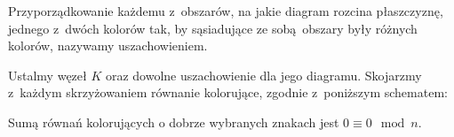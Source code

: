 \begin{definition}[uszachowienie]
    Przyporządkowanie każdemu z~obszarów, na jakie diagram rozcina płaszczyznę, jednego z~dwóch kolorów tak, by sąsiadujące ze sobą obszary były różnych kolorów, nazywamy uszachowieniem.
\end{definition}

Ustalmy węzeł $K$ oraz dowolne uszachowienie dla jego diagramu.
Skojarzmy z~każdym skrzyżowaniem równanie kolorujące, zgodnie z~poniższym schematem:
\begin{comment}
\[\begin{tikzpicture}[baseline=-0.65ex, scale=0.12]
    \useasboundingbox (-5, -10) rectangle (5,5);
    \begin{knot}[clip width=5, end tolerance=1pt, flip crossing/.list={1}]
        \strand[semithick] (-5,5) to (5,-5);
        \strand[semithick] (-5,-5) to (5,5);
        \fill[blue!20!white] (-4, 5) to (0, 1) to (4, 5);
        \fill[blue!20!white] (-4, -5) to (0, -1) to (4, -5);
        \node[darkblue] at (-5, -5)[left] {$a$};
        \node[darkblue] at (-5, +5)[left] {$b$};
        \node[darkblue] at (+5, -5)[right] {$c$};
        \node[darkblue] at (+5, +5)[right] {$a$};
        \node[darkblue] at (0, -10) {$+a-b+a-c=0 \mod n$};
    \end{knot}
    \end{tikzpicture}
    \quad\quad\quad\quad\quad\quad\quad\quad\quad\quad\quad\quad
    \begin{tikzpicture}[baseline=-0.65ex, scale=0.12]
    \useasboundingbox (-5, -10) rectangle (5,5);
    \begin{knot}[clip width=5, end tolerance=1pt, flip crossing/.list={1}]
        \strand[semithick] (-5,5) to (5,-5);
        \strand[semithick] (-5,-5) to (5,5);
        \fill[blue!20!white] (5, -4) to (1, 0) to (5, 4);
        \fill[blue!20!white] (-5, -4) to (-1, 0) to (-5, 4);
        \node[darkblue] at (-5, -5)[left] {$a$};
        \node[darkblue] at (-5, +5)[left] {$b$};
        \node[darkblue] at (+5, -5)[right] {$c$};
        \node[darkblue] at (+5, +5)[right] {$a$};
        \node[darkblue] at (0, -10) {$-a+b-a+c=0 \mod n$};
    \end{knot}
    \end{tikzpicture}
\]
\end{comment}

\begin{proposition}
    \label{prp:colouring_sum_zero}
    Sumą równań kolorujących o dobrze wybranych znakach jest $0 \equiv 0 \mod n$.
\end{proposition}

